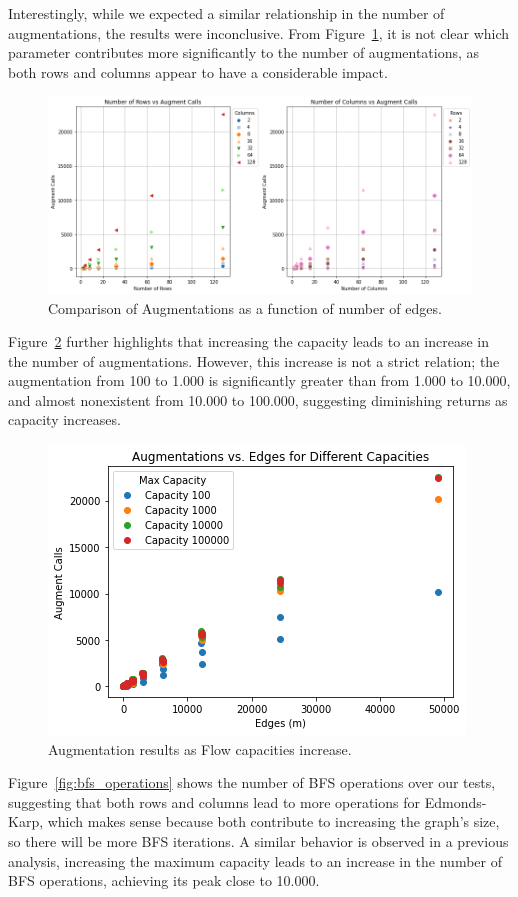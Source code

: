 \documentclass{article}
\begin{document}
Interestingly, while we expected a similar relationship in the number of augmentations, the results were inconclusive. From Figure~\ref{fig:augmentations}, it is not clear which parameter contributes more significantly to the number of augmentations, as both rows and columns appear to have a considerable impact.

\begin{figure}[H]
\centering
\includegraphics[width=1.0\linewidth]{augmentations.png}
\caption{Comparison of Augmentations as a function of number of edges.}
\label{fig:augmentations}
\end{figure}

Figure~\ref{fig:eaugmentations} further highlights that increasing the capacity leads to an increase in the number of augmentations. However, this increase is not a strict relation; the augmentation from 100 to 1.000 is significantly greater than from 1.000 to 10.000, and almost nonexistent from 10.000 to 100.000, suggesting diminishing returns as capacity increases.

\begin{figure}[H]
\centering
\includegraphics[width=0.6\linewidth]{edges_aug.png}
\caption{Augmentation results as Flow capacities increase.}
\label{fig:eaugmentations}
\end{figure}

Figure~\ref{fig:bfs_operations} shows the number of BFS operations over our tests, suggesting that both rows and columns lead to more operations for Edmonds-Karp, which makes sense because both contribute to increasing the graph's size, so there will be more BFS iterations. A similar behavior is observed in a previous analysis, increasing the maximum capacity leads to an increase in the number of BFS operations, achieving its peak close to 10.000.
\end{document}
